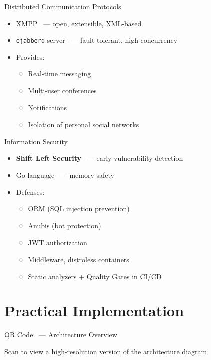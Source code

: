 \documentclass[10pt, aspectratio=169]{beamer}
\begin{document}
\begin{frame}{Distributed Communication Protocols}
	\begin{itemize}
		\item XMPP ~--- open, extensible, XML-based
		\item \texttt{ejabberd} server ~--- fault-tolerant, high concurrency
		\item Provides:
		      \begin{itemize}
			      \item Real-time messaging
			      \item Multi-user conferences
			      \item Notifications
			      \item Isolation of personal social networks
		      \end{itemize}
	\end{itemize}
\end{frame}

\begin{frame}{Information Security}
	\begin{itemize}
		\item \textbf{Shift Left Security} ~--- early vulnerability detection
		\item Go language ~--- memory safety
		\item Defenses:
		      \begin{itemize}
			      \item ORM (SQL injection prevention)
			      \item Anubis (bot protection)
			      \item JWT authorization
			      \item Middleware, distroless containers
			      \item Static analyzers + Quality Gates in CI/CD
		      \end{itemize}
	\end{itemize}
\end{frame}

\section{Practical Implementation}


\begin{frame}{QR Code ~--- Architecture Overview}
	\centering

	\vspace{1em}


	\small{Scan to view a high-resolution version of the architecture diagram}
\end{frame}
\end{document}
